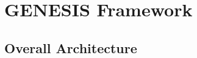 \documentclass[sigconf,anonymous]{aamas}
\begin{document}





\section{GENESIS Framework}

\subsection{Overall Architecture}


\end{document}
